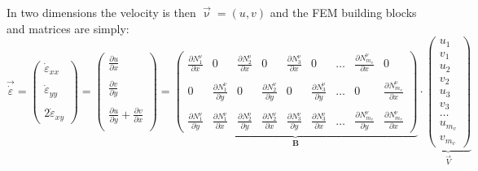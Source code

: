 In two dimensions the velocity is then $\vec\upnu=(u,v)$ and the FEM building blocks and matrices are simply:
\begin{equation}
\vec{\dot\varepsilon}
=
\left(
\begin{array}{c}
\dot \varepsilon_{xx} \\\\
\dot \varepsilon_{yy} \\\\
2\dot \varepsilon_{xy} 
\end{array}
\right)
=
\left(
\begin{array}{c}
\frac{\partial u}{\partial x} \\ \\
\frac{\partial v}{\partial y} \\ \\
\frac{\partial u}{\partial y} + \frac{\partial v}{\partial x} \\
\end{array}
\right)
=
\underbrace{
\left(
\begin{array}{ccccccccccc}
\frac{\partial N_1^\upnu}{\partial x} & 0 & 
\frac{\partial N_2^\upnu}{\partial x} & 0 & 
\frac{\partial N_3^\upnu}{\partial x} & 0 & \dots & 
\frac{\partial N_{m_v}^\upnu}{\partial x} & 0
\\  \\
0 & \frac{\partial N_1^\upnu}{\partial y} & 
0 & \frac{\partial N_2^\upnu}{\partial y} &
0 & \frac{\partial N_3^\upnu}{\partial y} & \dots & 
0 & \frac{\partial N_{m_v}^\upnu}{\partial x} 
\\ \\
\frac{\partial N_1^\upnu}{\partial y} &  \frac{\partial N_1^\upnu}{\partial x} &  
\frac{\partial N_2^\upnu}{\partial y} &  \frac{\partial N_2^\upnu}{\partial x} & 
\frac{\partial N_3^\upnu}{\partial y} &  \frac{\partial N_3^\upnu}{\partial x} &   \dots &  
\frac{\partial N_{m_v}^\upnu}{\partial y} &  \frac{\partial N_{m_v}^\upnu}{\partial x}  
\end{array}
\right) 
}_{\bm B}
\cdot
\underbrace{
\left(
\begin{array}{c}
u_1 \\ v_1 \\ u_2 \\ v_2 \\ u_3 \\ v_3 \\ \dots \\ u_{m_v} \\ v_{m_v}
\end{array}
\right)
}_{\vec V}
\end{equation}

